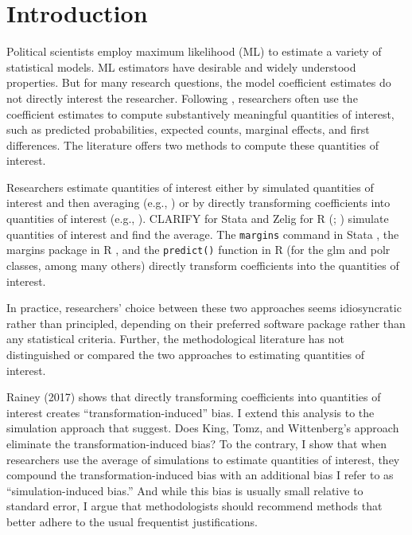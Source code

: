 \documentclass[12pt]{article}
\begin{document}

\thispagestyle{empty}
\newpage

\onehalfspace
\section*{Introduction}

\setcounter{page}{1}

Political scientists employ maximum likelihood (ML) to estimate a variety of statistical models. 
ML estimators have desirable and widely understood properties. 
But for many research questions, the model coefficient estimates do not directly interest the researcher. 
Following \cite{KingTomzWittenberg2000}, researchers often use the coefficient estimates to compute substantively meaningful quantities of interest, such as predicted probabilities, expected counts, marginal effects, and first differences. The literature offers two methods to compute these quantities of interest. 

Researchers estimate quantities of interest either by simulated quantities of interest and then averaging (e.g., \citealt{KingTomzWittenberg2000}) or by directly transforming coefficients into quantities of interest (e.g., \citealt{Herron1999}).
CLARIFY for Stata \citep{TomzWittenbergKing2003} and Zelig for R (\citealt{ImaiKingLau2008}; \citealt{Choiratetal}) simulate quantities of interest and find the average. 
The \texttt{margins} command in Stata \citep{StataManual}, the margins package in R \citep{margins}, and the \texttt{predict()} function in R (for the glm \citep{R} and polr \citep{MASS} classes, among many others) directly transform coefficients into the quantities of interest.

In practice, researchers' choice between these two approaches seems idiosyncratic rather than principled, depending on their preferred software package rather than any statistical criteria. 
Further, the methodological literature has not distinguished or compared the two approaches to estimating quantities of interest.

Rainey (2017) shows that directly transforming coefficients into quantities of interest creates ``transformation-induced'' bias. I extend this analysis to the simulation approach that \cite{KingTomzWittenberg2000} suggest. 
Does King, Tomz, and Wittenberg's approach eliminate the transformation-induced bias? 
To the contrary, I show that when researchers use the average of simulations to estimate quantities of interest, they compound the transformation-induced bias with an additional bias I refer to as ``simulation-induced bias.'' And while this bias is usually small relative to standard error, I argue that methodologists should recommend methods that better adhere to the usual frequentist justifications. 
\end{document}
